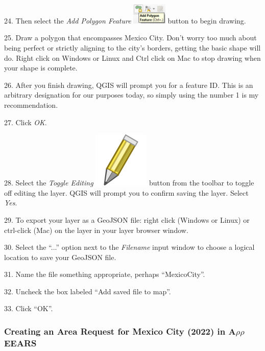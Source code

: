 \documentclass[oneside,a4paper,11pt,explicit]{book}
\begin{document}
24. Then select the \textit{Add Polygon Feature} \includegraphics[height=10mm]{addpolygon.png} button to begin drawing. 

25. Draw a polygon that encompasses Mexico City. Don't worry too much about being perfect or strictly aligning to the city's borders, getting the basic shape will do. Right click on Windows or Linux and Ctrl click on Mac to stop drawing when your shape is complete.


26. After you finish drawing, QGIS will prompt you for a feature ID. This is an arbitrary designation for our purposes today, so simply using the number 1 is my recommendation. 

27. Click \textit{OK}. 

28. Select the \textit{Toggle Editing} \includegraphics[height=\fontcharht\font`\B]{mActionToggleEditing.png} button from the toolbar to toggle off editing the layer. QGIS will prompt you to confirm saving the layer. Select \textit{Yes}.

29. To export your layer as a GeoJSON file: right click (Windows or Linux) or ctrl-click (Mac) on the layer in your layer browser window. 

30. Select the ``...'' option next to the \textit{Filename} input window to choose a logical location to save your GeoJSON file.

31. Name the file something appropriate, perhaps ``MexicoCity''. 

32. Uncheck the box labeled ``Add saved file to map''. 

33. Click ``OK''.

\subsubsection{Creating an Area Request for Mexico City (2022) in A$\rho\rho$EEARS}
\end{document}
